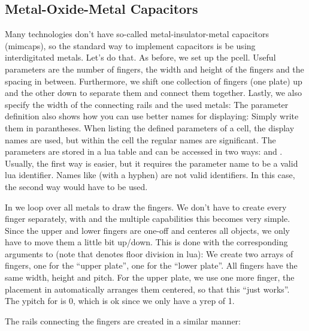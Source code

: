 \subsection{Metal-Oxide-Metal Capacitors}
Many technologies don't have so-called metal-insulator-metal capacitors (mimcaps), so the standard way to implement capacitors is be using interdigitated metals.
Let's do that. As before, we set up the pcell. Useful parameters are the number of fingers, the width and height of the fingers and the spacing in between.
Furthermore, we shift one collection of fingers (one plate) up and the other down to separate them and connect them together.
Lastly, we also specify the width of the connecting rails and the used metals:
The parameter definition also shows how you can use better names for displaying: Simply write them in parantheses.
When listing the defined parameters of a cell, the display names are used, but within the cell the regular names are significant.
The parameters are stored in a lua table and can be accessed in two ways:
 and .
Usually, the first way is easier, but it requires the parameter name to be a valid lua identifier.
Names like  (with a hyphen) are not valid identifiers.
In this case, the second way would have to be used.

In  we  loop over all metals to draw the fingers.
We don't have to create every finger separately, with  and the multiple capabilities this becomes very simple.
Since the upper and lower fingers are one-off and  centeres all objects, we only have to move them a little bit up/down.
This is done with the corresponding arguments to  (note that \luainline{//} denotes floor division in lua):
We create two arrays of fingers, one for the \enquote{upper plate}, one for the \enquote{lower plate}. All fingers have the same width, height and pitch. For the
upper plate, we use one more finger, the placement in  automatically arranges them centered, so that this \enquote{just works}.  The
ypitch for  is \num{0}, which is ok since we only have a yrep of \num{1}.

The rails connecting the fingers are created in a similar manner:

